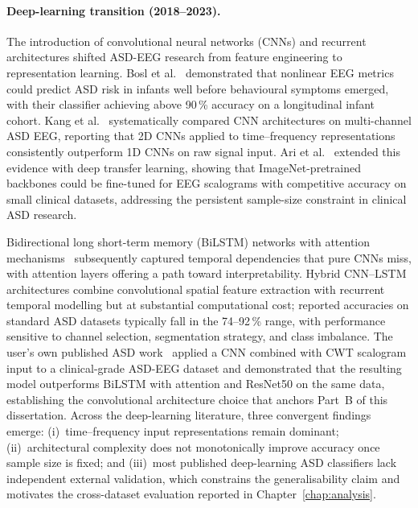 \paragraph{Deep-learning transition (2018--2023).}
The introduction of convolutional neural networks (CNNs) and recurrent architectures shifted ASD-EEG research from feature engineering to representation learning. Bosl et al.~\cite{bosl2018eeg} demonstrated that nonlinear EEG metrics could predict ASD risk in infants well before behavioural symptoms emerged, with their classifier achieving above 90\,\% accuracy on a longitudinal infant cohort. Kang et al.~\cite{kang2020asd} systematically compared CNN architectures on multi-channel ASD EEG, reporting that 2D CNNs applied to time--frequency representations consistently outperform 1D CNNs on raw signal input. Ari et al.~\cite{ari2022asd} extended this evidence with deep transfer learning, showing that ImageNet-pretrained backbones could be fine-tuned for EEG scalograms with competitive accuracy on small clinical datasets, addressing the persistent sample-size constraint in clinical ASD research.

Bidirectional long short-term memory (BiLSTM) networks with attention mechanisms~\cite{ahmad2020eeg} subsequently captured temporal dependencies that pure CNNs miss, with attention layers offering a path toward interpretability. Hybrid CNN--LSTM architectures combine convolutional spatial feature extraction with recurrent temporal modelling but at substantial computational cost; reported accuracies on standard ASD datasets typically fall in the 74--92\,\% range, with performance sensitive to channel selection, segmentation strategy, and class imbalance. The user's own published ASD work~\cite{asthana2025asd} applied a CNN combined with CWT scalogram input to a clinical-grade ASD-EEG dataset and demonstrated that the resulting model outperforms BiLSTM with attention and ResNet50 on the same data, establishing the convolutional architecture choice that anchors Part~B of this dissertation. Across the deep-learning literature, three convergent findings emerge: (i)~time--frequency input representations remain dominant; (ii)~architectural complexity does not monotonically improve accuracy once sample size is fixed; and (iii)~most published deep-learning ASD classifiers lack independent external validation, which constrains the generalisability claim and motivates the cross-dataset evaluation reported in Chapter~\ref{chap:analysis}.

